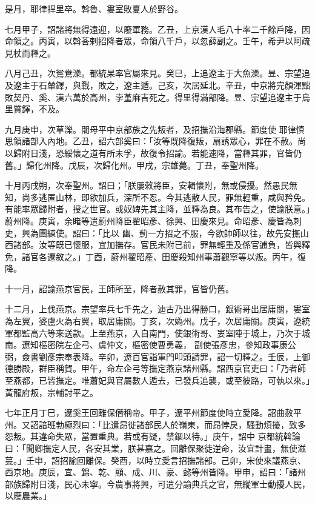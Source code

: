 \begin{pinyinscope}
 是月，耶律捍里卒。斡魯、婁室敗夏人於野谷。



 七月甲子，詔諸將無得遠迎，以廢軍務。乙丑，上京漢人毛八十率二千餘戶降，因命領之。丙寅，以斡荅剌招降者眾，命領八千戶，以忽薛副之。壬午，希尹以阿疏見杖而釋之。



 八月己丑，次鴛鴦濼。都統杲率官屬來見。癸巳，上追遼主于大魚濼。昱、宗望追及遼主于石輦鐸，與戰，敗之，遼主遁。己亥，次居延北。辛丑，中京將完顏渾黜敗契丹、奚、漢六萬於高州，孛堇麻吉死之。得里得滿部降。昱、宗望追遼主于烏里質鐸，不及。



 九月庚申，次草濼。闍母平中京部族之先叛者，及招撫沿海郡縣。節度使
 耶律慎思領諸部入內地。乙丑，詔六部奚曰：「汝等既降復叛，扇誘眾心，罪在不赦。尚以歸附日淺，恐綏懷之道有所未孚，故復令招諭。若能速降，當釋其罪，官皆仍舊。」歸化州降。戊辰，次歸化州。甲戌，宗雄薨。丁丑，奉聖州降。



 十月丙戌朔，次奉聖州。詔曰；「朕屢敕將臣，安輯懷附，無或侵擾。然愚民無知，尚多逃匿山林，即欲加兵，深所不忍。今其逃散人民，罪無輕重，咸與矜免。有能率眾歸附者，授之世官。或奴婢先其主降，並釋為良。其布告之，使諭朕意。」蔚州降。庚寅，余睹等遣蔚州降臣翟昭彥、徐興、田慶來見。命昭彥、慶皆為刺史，興為團練使。詔曰：「比以
 幽、薊一方招之不服，今欲帥師以往，故先安撫山西諸部。汝等既已懷服，宜加撫存。官民未附已前，罪無輕重及係官逋負，皆與釋免，諸官各遷敘之。」丁酉，蔚州翟昭產、田慶殺知州事蕭觀寧等以叛。丙午，復降。



 十一月，詔諭燕京官民，王師所至，降者赦其罪，官皆仍舊。



 十二月，上伐燕京。宗望率兵七千先之，迪古乃出得勝口，銀術哥出居庸關，婁室為左翼，婆盧火為右翼，取居庸關。丁亥，次媯州。戊子，次居庸關。庚寅，遼統軍都監高六等來送款。上至燕京，入自南門，使銀術哥、婁室陣于城上，乃次于城南。遼知樞密院左企弓、虞仲文，樞密使曹勇義，
 副使張彥忠，參知政事康公弼，僉書劉彥宗奉表降。辛卯，遼百官詣軍門叩頭請罪，詔一切釋之。壬辰，上御德勝殿，群臣稱賀。甲午，命左企弓等撫定燕京諸州縣。詔西京官吏曰：「乃者師至燕都，已皆撫定。唯蕭妃與官屬數人遁去，已發兵追襲，或至彼路，可執以來。」黃龍府叛，宗輔討平之。



 七年正月丁巳，遼奚王回離保僭稱帝。甲子，遼平州節度使時立愛降。詔曲赦平州。又詔諳班勃極烈曰：「比遣昂徙諸部民人於嶺東，而昂悖戾，騷動煩擾，致多怨叛。其違命失眾，當置重典。若或有疑，禁錮以待。」庚午，詔中
 京都統斡論曰：「聞卿撫定人民，各安其業，朕甚嘉之。回離保聚徒逆命，汝宜計畫，無使滋蔓。」壬申，詔招諭回離保。癸酉，以時立愛言招撫諸部。己卯，宋使來議燕京、西京地。庚辰，宜、錦、乾、顯、成、川、豪、懿等州皆降。甲申，詔曰：「諸州部族歸附日淺，民心未寧。今農事將興，可遣分諭典兵之官，無縱軍士動擾人民，以廢農業。」




\end{pinyinscope}
